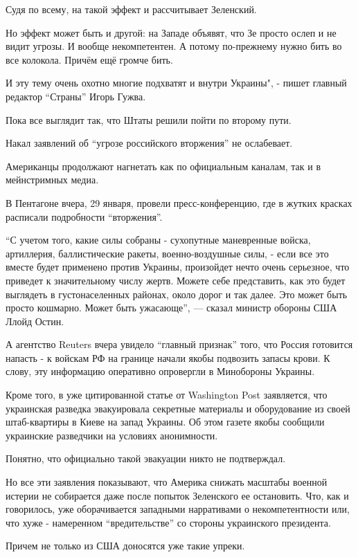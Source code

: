 Судя по всему, на такой эффект и рассчитывает Зеленский.

Но эффект может быть и другой: на Западе объявят, что Зе просто ослеп и не
видит угрозы. И вообще некомпетентен. А потому по-прежнему нужно бить во все
колокола. Причём ещё громче бить.

И эту тему очень охотно многие подхватят и внутри Украины", - пишет главный
редактор \enquote{Страны} Игорь Гужва.

Пока все выглядит так, что Штаты решили пойти по второму пути.

Накал заявлений об \enquote{угрозе российского вторжения} не ослабевает.

Американцы продолжают нагнетать как по официальным каналам, так и в мейнстримных медиа.

В Пентагоне вчера, 29 января, провели пресс-конференцию, где в жутких красках
расписали подробности \enquote{вторжения}. 

\enquote{С учетом того, какие силы собраны - сухопутные маневренные войска,
артиллерия, баллистические ракеты, военно-воздушные силы, - если все это вместе
будет применено против Украины, произойдет нечто очень серьезное, что приведет
к значительному числу жертв. Можете себе представить, как это будет выглядеть в
густонаселенных районах, около дорог и так далее. Это может быть просто
кошмарно. Может быть ужасающе}, — сказал министр обороны США Ллойд Остин.

А агентство Reuters вчера увидело \enquote{главный признак} того, что Россия
готовится напасть - к войскам РФ на границе начали якобы подвозить запасы
крови. К слову, эту информацию оперативно опровергли в Минобороны Украины.

Кроме того, в уже цитированной статье от Washington Post заявляется, что
украинская разведка эвакуировала секретные материалы и оборудование из своей
штаб-квартиры в Киеве на запад Украины. Об этом газете якобы сообщили
украинские разведчики на условиях анонимности.

Понятно, что официально такой эвакуации никто не подтверждал.

Но все эти заявления показывают, что Америка снижать масштабы военной истерии
не собирается даже после попыток Зеленского ее остановить. Что, как и
говорилось, уже оборачивается западными нарративами о некомпетентности или, что
хуже - намеренном \enquote{вредительстве} со стороны украинского президента. 

Причем не только из США доносятся уже такие упреки.

